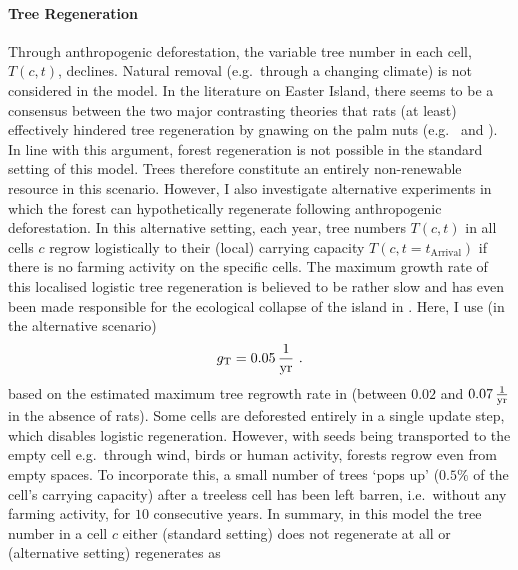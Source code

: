 \paragraph{Tree Regeneration}
Through anthropogenic deforestation, the variable tree number in each cell, $T(c,t)$, declines.
Natural removal (e.g.\ through a changing climate) is not considered in the model.
In the literature on Easter Island, there seems to be a consensus between the two major contrasting theories that rats (at least) effectively hindered tree regeneration by gnawing on the palm nuts (e.g.\ \citet{Bahn2017} and \citet{Hunt2007}).
In line with this argument, forest regeneration is not possible in the standard setting of this model.
Trees therefore constitute an entirely non-renewable resource in this scenario. 
However, I also investigate alternative experiments in which the forest can hypothetically regenerate following anthropogenic deforestation.
In this alternative setting, each year, tree numbers $T(c,t)$ in all cells $c$ regrow logistically to their (local) carrying capacity $T(c,t=t_\text{Arrival})$ if there is no farming activity on the specific cells.
The maximum growth rate of this localised logistic tree regeneration is believed to be rather slow and has even been made responsible for the ecological collapse of the island in \citet{Brander1998}.
Here, I use (in the alternative scenario)
\begin{equation}
g_{\rm T} = 0.05\, {\rm \frac{1}{yr}} \ .
\end{equation}
based on the estimated maximum tree regrowth rate in \citet{Brandt2015} (between $0.02$ and $0.07\, {\rm \frac{1}{yr}}$ in the absence of rats).
Some cells are deforested entirely in a single update step, which disables logistic regeneration. 
However, with seeds being transported to the empty cell e.g.\ through wind, birds or human activity, forests regrow even from empty spaces.
To incorporate this, a small number of trees `pops up' ($0.5\%$ of the cell's carrying capacity) after a treeless cell has been left barren, i.e.\ without any farming activity, for $10$ consecutive years.
In summary, in this model the tree number in a cell $c$ either (standard setting) does not regenerate at all or (alternative setting) regenerates as
